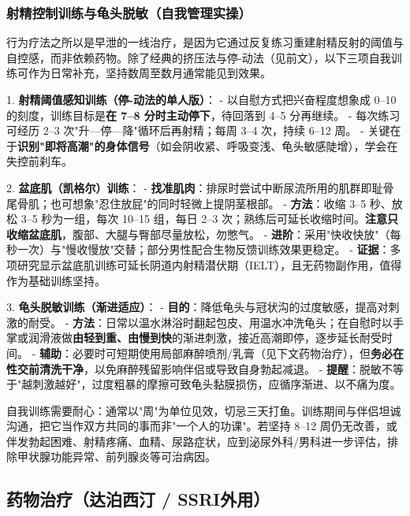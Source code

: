 \subsubsection{射精控制训练与龟头脱敏（自我管理实操）}

行为疗法之所以是早泄的一线治疗，是因为它通过反复练习重建射精反射的阈值与自控感，而非依赖药物。除了经典的挤压法与停-动法（见前文），以下三项自我训练可作为日常补充，坚持数周至数月通常能见到效果。

1. \textbf{射精阈值感知训练（停-动法的单人版）}：
   - 以自慰方式把兴奋程度想象成 0--10 的刻度，训练目标是\textbf{在 7--8 分时主动停下}，待回落到 4--5 分再继续。
   - 每次练习可经历 2--3 次"升—停—降"循环后再射精；每周 3--4 次，持续 6--12 周。
   - 关键在于\textbf{识别"即将高潮"的身体信号}（如会阴收紧、呼吸变浅、龟头敏感陡增），学会在失控前刹车。

2. \textbf{盆底肌（凯格尔）训练}：
   - \textbf{找准肌肉}：排尿时尝试中断尿流所用的肌群即耻骨尾骨肌；也可想象"忍住放屁"的同时轻微上提阴茎根部。
   - \textbf{方法}：收缩 3--5 秒、放松 3--5 秒为一组，每次 10--15 组，每日 2--3 次；熟练后可延长收缩时间。\textbf{注意只收缩盆底肌}，腹部、大腿与臀部尽量放松，勿憋气。
   - \textbf{进阶}：采用"快收快放"（每秒一次）与"慢收慢放"交替；部分男性配合生物反馈训练效果更稳定。
   - \textbf{证据}：多项研究显示盆底肌训练可延长阴道内射精潜伏期（IELT），且无药物副作用，值得作为基础训练坚持。

3. \textbf{龟头脱敏训练（渐进适应）}：
   - \textbf{目的}：降低龟头与冠状沟的过度敏感，提高对刺激的耐受。
   - \textbf{方法}：日常以温水淋浴时翻起包皮、用温水冲洗龟头；在自慰时以手掌或润滑液做\textbf{由轻到重、由慢到快}的渐进刺激，接近高潮即停，逐步延长耐受时间。
   - \textbf{辅助}：必要时可短期使用局部麻醉喷剂/乳膏（见下文药物治疗），但\textbf{务必在性交前清洗干净}，以免麻醉残留影响伴侣或导致自身勃起减退。
   - \textbf{提醒}：脱敏不等于"越刺激越好"，过度粗暴的摩擦可致龟头黏膜损伤，应循序渐进、以不痛为度。

\begin{tcolorbox}[colback=pink!5!white,colframe=red!50!black,title=贴心小叮咛]
自我训练需要耐心：通常以"周"为单位见效，切忌三天打鱼。训练期间与伴侣坦诚沟通，把它当作双方共同的事而非"一个人的功课"。若坚持 8--12 周仍无改善，或伴发勃起困难、射精疼痛、血精、尿路症状，应到泌尿外科/男科进一步评估，排除甲状腺功能异常、前列腺炎等可治病因。
\end{tcolorbox}

\subsection{药物治疗（达泊西汀 / SSRI外用）}

